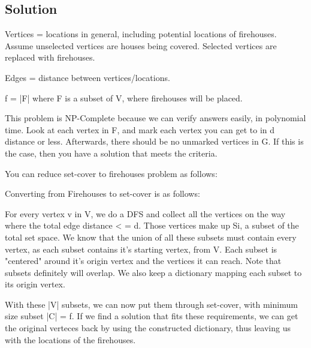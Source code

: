 \subsection*{Solution}

Vertices = locations in general, including potential locations of firehouses. Assume unselected vertices are houses being covered. Selected vertices are replaced with firehouses.

Edges = distance between vertices/locations. 

f = |F| where F is a subset of V, where firehouses will be placed.

This problem is NP-Complete because we can verify answers easily, in polynomial time. Look at each vertex in F, and mark each vertex you can get to in d distance or less. Afterwards, there should be no unmarked vertices in G. If this is the case, then you have a solution that meets the criteria.

You can reduce set-cover to firehouses problem as follows:

Converting from Firehouses to set-cover is as follows:

For every vertex v in V, we do a DFS and collect all the vertices on the way where the total edge distance < = d. Those vertices make up Si, a subset of the total set space. We know that the union of all these subsets must contain every vertex, as each subset contains it's starting vertex, from V. Each subset is "centered" around it's origin vertex and the vertices it can reach. Note that subsets definitely will overlap. We also keep a dictionary mapping each subset to its origin vertex.

With these |V| subsets, we can now put them through set-cover, with minimum size subset |C| = f. If we find a solution that fits these requirements, we can get the original verteces back by using the constructed dictionary, thus leaving us with the locations of the firehouses.
